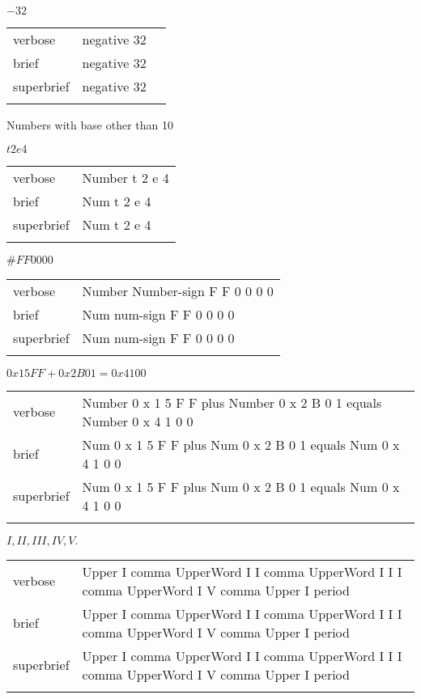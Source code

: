 \E $-32$
\begin{longtable}[c]{@{}lll@{}}
\toprule\addlinespace
verbose & negative 32 &

\\\addlinespace
brief & negative 32 &

\\\addlinespace
superbrief & negative 32 &

\\\addlinespace
\bottomrule
\end{longtable}


\R
Numbers with base other than 10


\R
\E $t2e4$
\begin{longtable}[c]{@{}ll@{}}
\toprule\addlinespace
verbose & Number t 2 e 4
\\\addlinespace
brief & Num t 2 e 4
\\\addlinespace
superbrief & Num t 2 e 4
\\\addlinespace
\bottomrule
\end{longtable}


\E $\#FF0000$
\begin{longtable}[c]{@{}ll@{}}
\toprule\addlinespace
verbose & Number Number-sign F F 0 0 0 0
\\\addlinespace
brief & Num num-sign F F 0 0 0 0
\\\addlinespace
superbrief & Num num-sign F F 0 0 0 0
\\\addlinespace
\bottomrule
\end{longtable}


\E $0x15FF + 0x2B01 = 0x4100$
\begin{longtable}[c]{@{}ll@{}}
\toprule\addlinespace
verbose & Number 0 x 1 5 F F plus Number 0 x 2 B 0 1 equals Number 0 x 4
1 0 0
\\\addlinespace
brief & Num 0 x 1 5 F F plus Num 0 x 2 B 0 1 equals Num 0 x 4 1 0 0
\\\addlinespace
superbrief & Num 0 x 1 5 F F plus Num 0 x 2 B 0 1 equals Num 0 x 4 1 0 0
\\\addlinespace
\bottomrule
\end{longtable}


\R
\E $I,II,III,IV,V.$
\begin{longtable}[c]{@{}ll@{}}
\toprule\addlinespace
verbose & Upper I comma UpperWord I I comma UpperWord I I I comma
UpperWord I V comma Upper I period
\\\addlinespace
brief & Upper I comma UpperWord I I comma UpperWord I I I comma
UpperWord I V comma Upper I period
\\\addlinespace
superbrief & Upper I comma UpperWord I I comma UpperWord I I I comma
UpperWord I V comma Upper I period
\\\addlinespace
\bottomrule
\end{longtable}


